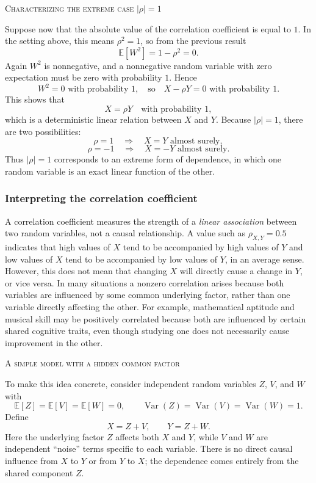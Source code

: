 \bigskip
\textsc{Characterizing the extreme case \(|\rho|=1\)}

Suppose now that the absolute value of the correlation coefficient is equal to \(1\).  
In the setting above, this means \(\rho^{2}=1\), so from the previous result
\[
\mathbb{E}[W^{2}]
=
1-\rho^{2}
=
0.
\]
Again \(W^{2}\) is nonnegative, and a nonnegative random variable with zero expectation must be zero with probability \(1\).  
Hence
\[
W^{2} = 0 \text{ with probability }1,
\quad\text{so}\quad
X-\rho Y = 0 \text{ with probability }1.
\]
This shows that
\[
X = \rho Y
\quad\text{with probability }1,
\]
which is a deterministic linear relation between \(X\) and \(Y\).  
Because \(|\rho|=1\), there are two possibilities:
\[
\rho = 1 \quad\Longrightarrow\quad X = Y \text{ almost surely},
\]
\[
\rho = -1 \quad\Longrightarrow\quad X = -Y \text{ almost surely}.
\]
Thus \(|\rho|=1\) corresponds to an extreme form of dependence, in which one random variable is an exact linear function of the other.


\subsubsection{Interpreting the correlation coefficient}

A correlation coefficient measures the strength of a \textit{linear association} between two random variables, not a causal relationship.  
A value such as \(\rho_{X,Y} = 0.5\) indicates that high values of \(X\) tend to be accompanied by high values of \(Y\) and low values of \(X\) tend to be accompanied by low values of \(Y\), in an average sense.  
However, this does not mean that changing \(X\) will directly cause a change in \(Y\), or vice versa.  
In many situations a nonzero correlation arises because both variables are influenced by some common underlying factor, rather than one variable directly affecting the other.  
For example, mathematical aptitude and musical skill may be positively correlated because both are influenced by certain shared cognitive traits, even though studying one does not necessarily cause improvement in the other.

\bigskip
\textsc{A simple model with a hidden common factor}

To make this idea concrete, consider independent random variables \(Z\), \(V\), and \(W\) with
\[
\mathbb{E}[Z] = \mathbb{E}[V] = \mathbb{E}[W] = 0,
\qquad
\operatorname{Var}(Z) = \operatorname{Var}(V) = \operatorname{Var}(W) = 1.
\]
Define
\[
X = Z + V,
\qquad
Y = Z + W.
\]
Here the underlying factor \(Z\) affects both \(X\) and \(Y\), while \(V\) and \(W\) are independent “noise” terms specific to each variable.  
There is no direct causal influence from \(X\) to \(Y\) or from \(Y\) to \(X\); the dependence comes entirely from the shared component \(Z\).

